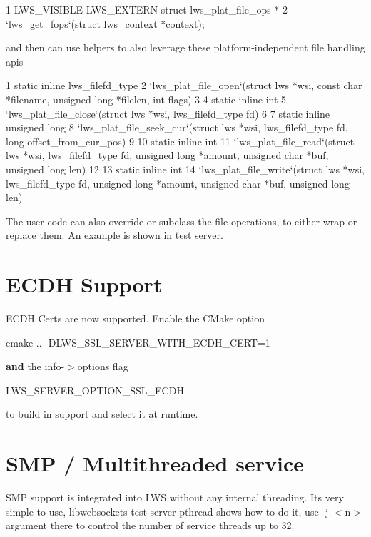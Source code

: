 \begin{DoxyCode}
1 LWS\_VISIBLE LWS\_EXTERN struct lws\_plat\_file\_ops *
2         `lws\_get\_fops`(struct lws\_context *context);
\end{DoxyCode}


and then can use helpers to also leverage these platform-\/independent file handling apis


\begin{DoxyCode}
1 static inline lws\_filefd\_type
2 `lws\_plat\_file\_open`(struct lws *wsi, const char *filename, unsigned long *filelen, int flags)
3 
4 static inline int
5 `lws\_plat\_file\_close`(struct lws *wsi, lws\_filefd\_type fd)
6 
7 static inline unsigned long
8 `lws\_plat\_file\_seek\_cur`(struct lws *wsi, lws\_filefd\_type fd, long offset\_from\_cur\_pos)
9 
10 static inline int
11 `lws\_plat\_file\_read`(struct lws *wsi, lws\_filefd\_type fd, unsigned long *amount, unsigned char *buf,
       unsigned long len)
12 
13 static inline int
14 `lws\_plat\_file\_write`(struct lws *wsi, lws\_filefd\_type fd, unsigned long *amount, unsigned char *buf,
       unsigned long len)
\end{DoxyCode}


The user code can also override or subclass the file operations, to either wrap or replace them. An example is shown in test server.\hypertarget{md_README.coding_ecdh}{}\section{E\+C\+D\+H Support}\label{md_README.coding_ecdh}
E\+C\+DH Certs are now supported. Enable the C\+Make option \begin{DoxyVerb}    cmake .. -DLWS_SSL_SERVER_WITH_ECDH_CERT=1 
\end{DoxyVerb}


{\bfseries and} the info-\/$>$options flag \begin{DoxyVerb}    LWS_SERVER_OPTION_SSL_ECDH
\end{DoxyVerb}


to build in support and select it at runtime.\hypertarget{md_README.coding_smp}{}\section{S\+M\+P / Multithreaded service}\label{md_README.coding_smp}
S\+MP support is integrated into L\+WS without any internal threading. It\textquotesingle{}s very simple to use, libwebsockets-\/test-\/server-\/pthread shows how to do it, use -\/j $<$n$>$ argument there to control the number of service threads up to 32.

